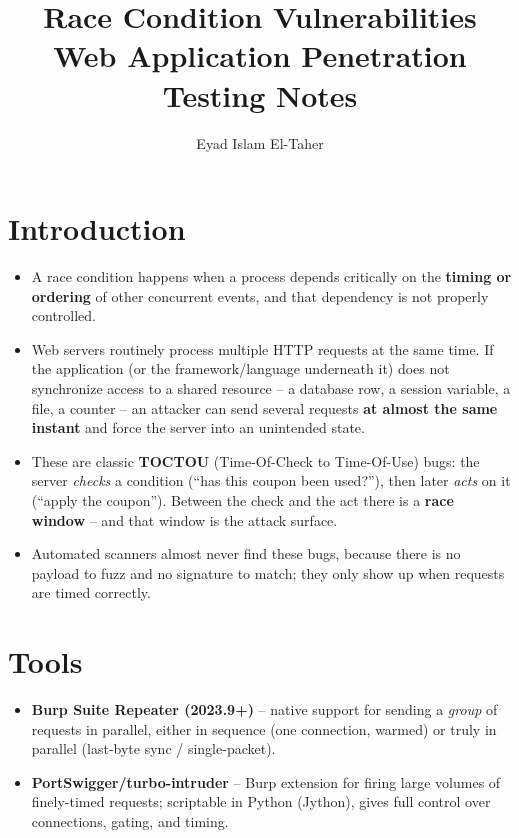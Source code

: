 \documentclass[11pt]{article}
\title{\textbf{Race Condition Vulnerabilities}\\\large Web Application Penetration Testing Notes}
\author{Eyad Islam El-Taher}
\date{}
\begin{document}
\maketitle
\tableofcontents
\newpage

\section{Introduction}
\begin{itemize}[leftmargin=1.2em]
  \item A race condition happens when a process depends critically on the \textbf{timing or ordering} of other concurrent events, and that dependency is not properly controlled.
  \item Web servers routinely process multiple HTTP requests at the same time. If the application (or the framework/language underneath it) does not synchronize access to a shared resource -- a database row, a session variable, a file, a counter -- an attacker can send several requests \textbf{at almost the same instant} and force the server into an unintended state.
  \item These are classic \textbf{TOCTOU} (Time-Of-Check to Time-Of-Use) bugs: the server \emph{checks} a condition (``has this coupon been used?''), then later \emph{acts} on it (``apply the coupon''). Between the check and the act there is a \textbf{race window} -- and that window is the attack surface.
  \item Automated scanners almost never find these bugs, because there is no payload to fuzz and no signature to match; they only show up when requests are timed correctly.
\end{itemize}

\section{Tools}
\begin{itemize}[leftmargin=1.2em]
  \item \textbf{Burp Suite Repeater (2023.9+)} -- native support for sending a \textit{group} of requests in parallel, either in sequence (one connection, warmed) or truly in parallel (last-byte sync / single-packet).
  \item \textbf{PortSwigger/turbo-intruder} -- Burp extension for firing large volumes of finely-timed requests; scriptable in Python (Jython), gives full control over connections, gating, and timing.
\end{itemize}
\end{document}
